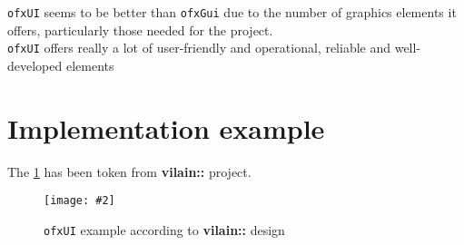 \documentclass[a4paper,titlepage,oneside]{article}
\newcommand{\image}[5][\textwidth]{%
    \begin{figure}[h]
        \centering
            \begin{minipage}[c]{#1}
                \centering
                \texttt{[image: \#2]}
                \caption{#4}
                \label{#5}
            \end{minipage}
    \end{figure}
}
\newcommand{\vilain}{\textbf{vilain::}}
\begin{document}
\texttt{ofxUI} seems to be better than \texttt{ofxGui} due to the number of graphics elements it offers, particularly those needed for the project.\\\texttt{ofxUI} offers really a lot of user-friendly and operational, reliable and well-developed elements

\newpage
\section{Implementation example}
The \figurename \ref{fig:GUIVilainExample} has been token from \vilain{} project.  \image{data/GUIVilain.jpg}{width=12cm}{\texttt{ofxUI} example according to \vilain{} design}{fig:GUIVilainExample}

\newpage
\printbibheading
\printbibliography[nottype=online,check=notonline,heading=subbibliography,title={Bibliography}]
\printbibliography[check=online,heading=subbibliography,title={Webography}]
\nocite{*}
\end{document}
